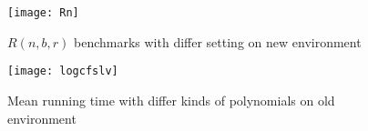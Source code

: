 %





\begin{figure}[!ht]
\begin{centering}
\texttt{[image: Rn]}
\caption{ $R(n,b,r)$ benchmarks  with differ setting on new environment\label{fig:2}}
\end{centering}
\end{figure}

\begin{figure}[!ht]
	\begin{centering}
		\texttt{[image: logcfslv]}
		\caption{ Mean running time with differ kinds of polynomials on old environment\label{fig:3}}
	\end{centering}
\end{figure}